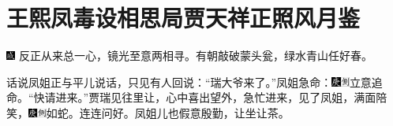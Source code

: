 

\chapter{王熙凤毒设相思局\hspace{.5em}贾天祥正照风月鉴}

{\includegraphics[width=3mm]{../Images/00005}  \kaishu  反正从来总一心，镜光至意两相寻。有朝敲破蒙头瓮，绿水青山任好春。}

话说凤姐正与平儿说话，只见有人回说：“瑞大爷来了。”凤姐急命：{\includegraphics[width=3mm]{../Images/00004}\includegraphics[width=3mm]{../Images/00011}\footnotesize \kaishu 立意追命。}“快请进来。”贾瑞见往里让，心中喜出望外，急忙进来，见了凤姐，满面陪笑，{\includegraphics[width=3mm]{../Images/00004}\includegraphics[width=3mm]{../Images/00011}\footnotesize \kaishu 如蛇。}连连问好。凤姐儿也假意殷勤，让坐让茶。

